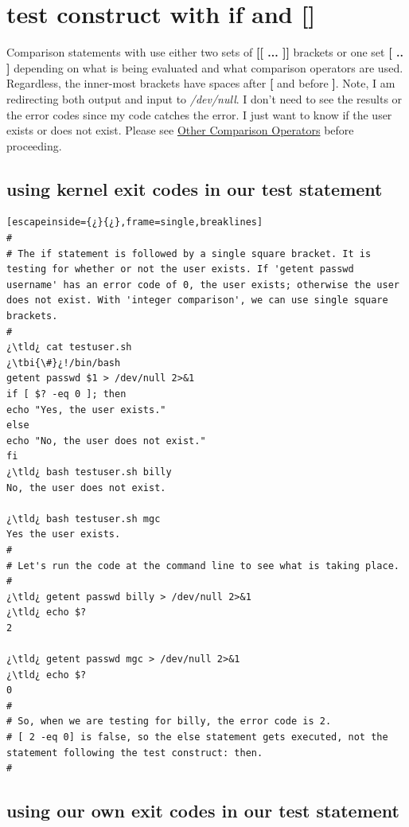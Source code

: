 \section{test construct with if and []}

Comparison statements with  use either two sets of \textbf{[[ ... ]]} brackets or one set \textbf{[ .. ]} depending on what is being evaluated and what comparison operators are used. Regardless, the inner-most brackets have spaces after \textbf{[} and before \textbf{]}. Note, I am redirecting both output and input to \textsl{/dev/null}. I don't need to see the results or the error codes since my code catches the error. I just want to know if the user exists or does not exist. Please see \href{http://www.tldp.org/LDP/abs/html/comparison-ops.html}{Other Comparison Operators} before proceeding.

\subsection{using kernel exit codes in our test statement}

\begin{lstlisting}[escapeinside={¿}{¿},frame=single,breaklines]
#
# The if statement is followed by a single square bracket. It is testing for whether or not the user exists. If 'getent passwd username' has an error code of 0, the user exists; otherwise the user does not exist. With 'integer comparison', we can use single square brackets.
#
¿\tld¿ cat testuser.sh
¿\tbi{\#}¿!/bin/bash
getent passwd $1 > /dev/null 2>&1
if [ $? -eq 0 ]; then
echo "Yes, the user exists."
else
echo "No, the user does not exist."
fi
¿\tld¿ bash testuser.sh billy
No, the user does not exist.

¿\tld¿ bash testuser.sh mgc
Yes the user exists.
#
# Let's run the code at the command line to see what is taking place.
#
¿\tld¿ getent passwd billy > /dev/null 2>&1
¿\tld¿ echo $?
2

¿\tld¿ getent passwd mgc > /dev/null 2>&1
¿\tld¿ echo $?
0
#
# So, when we are testing for billy, the error code is 2.
# [ 2 -eq 0] is false, so the else statement gets executed, not the statement following the test construct: then.
#
\end{lstlisting}

\subsection{using our own exit codes in our test statement}

